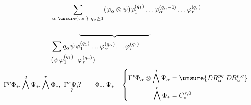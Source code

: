 \[
 \begin{aligned}
 &\sum_{\alpha\ \unsure{\mathrm{t.s.}}\ q_\alpha\geq1}
 (\varphi_\alpha\otimes\psi)\varphi_1^{(q_1)}\ldots
 \varphi_\alpha^{(q_\alpha-1)}\ldots\varphi_r^{(q_r)}\\
 &\hspace{4em}\underbrace{\phantom{\varphi_1^{(q_1)}\ldots
 \varphi_\alpha^{(q_\alpha-1)}\ldots\varphi_r^{(q_r)}}}\\
 &\sum q_\alpha\psi\,\varphi_1^{(q_1)}\ldots\varphi_\alpha^{(q_\alpha)}\ldots\varphi_r^{(q_r)}\\
 &(\psi\,\varphi_1^{(q_1)}\ \ \varphi_r^{(q_r)})
 \end{aligned}
\]
\[
 \Gamma^p\Phi_*,\bigwedge^q\Psi_*,\bigwedge^r\Phi_*,
 \ \underset{\text{?}}{\Gamma^s\Psi_*}\!?
 \qquad \Phi_*,\Psi_*\quad
 \left\{\begin{aligned}
 \Gamma^p\Phi_\alpha\otimes\bigwedge^q\Psi_\alpha&=
 \unsure{DR^{pq}_\alpha|DR^{p,q}_\alpha}\\
 \bigwedge^r\Phi_*&=C_*^{r,0}
 \end{aligned}\right.
\]
